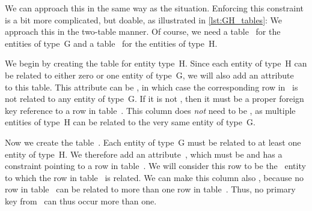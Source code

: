 We can approach this in the same way as the  situation.
Enforcing this constraint is a bit more complicated, but doable, as illustrated in \cref{lst:GH_tables}:
We approach this in the two-table manner.
Of course, we need a table~ for the entities of type~G and a table~ for the entities of type~H.

We begin by creating the table for entity type~H.
Since each entity of type~H can be related to either zero or one entity of type~G, we will also add an attribute~ to this table.
This attribute can be , in which case the corresponding row in~ is not related to any entity of type~G.
If it is not , then it must be a proper foreign key reference to a row in table~.
This column does \emph{not} need to be , as multiple entities of type~H can be related to the very same entity of type~G.

Now we create the table~.
Each entity of type~G must be related to at least one entity of type~H.
We therefore add an attribute~, which must be  and has a  constraint pointing to a row in table~.
We will consider this row to be the ~entity to which the row in table~ is related.
We can make this column also , because no row in table~ can be related to more than one row in table~.
Thus, no primary key from~ can thus occur more than one.

